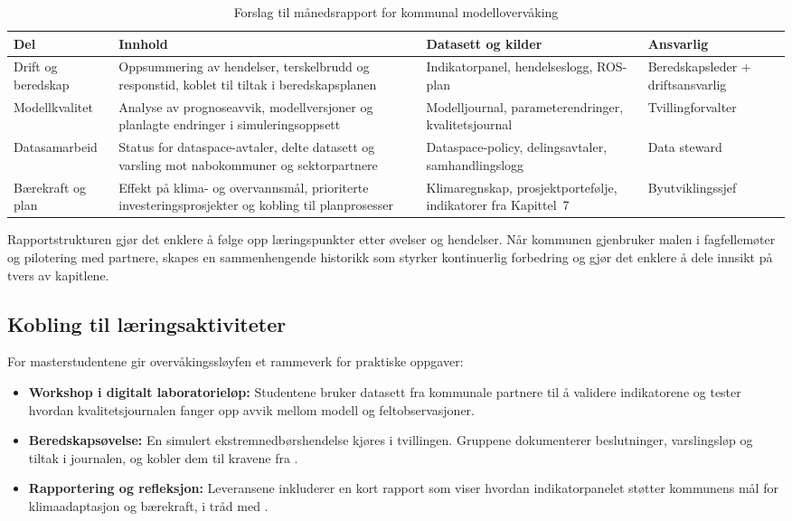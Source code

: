 \begin{table}[ht]
    \centering
    \caption{Forslag til månedsrapport for kommunal modellovervåking}
    \label{tab:manedsrapport}
    \begin{tabular}{|p{3.1cm}|p{4.8cm}|p{4.6cm}|p{3.0cm}|}
        \hline
        \textbf{Del} & \textbf{Innhold} & \textbf{Datasett og kilder} & \textbf{Ansvarlig} \\
        \hline
        Drift og beredskap & Oppsummering av hendelser, terskelbrudd og responstid, koblet til tiltak i beredskapsplanen & Indikatorpanel, hendelseslogg, ROS-plan \citep{dsb2022beredskap} & Beredskapsleder + driftsansvarlig \\
        \hline
        Modellkvalitet & Analyse av prognoseavvik, modellversjoner og planlagte endringer i simuleringsoppsett & Modelljournal, parameterendringer, kvalitetsjournal & Tvillingforvalter \\
        \hline
        Datasamarbeid & Status for dataspace-avtaler, delte datasett og varsling mot nabokommuner og sektorpartnere & Dataspace-policy, delingsavtaler, samhandlingslogg \citep{ks2022samhandling} & Data steward \\
        \hline
        Bærekraft og plan & Effekt på klima- og overvannsmål, prioriterte investeringsprosjekter og kobling til planprosesser & Klimaregnskap, prosjektportefølje, indikatorer fra Kapittel~7 & Byutviklingssjef \\
        \hline
    \end{tabular}
\end{table}

Rapportstrukturen gjør det enklere å følge opp læringspunkter etter øvelser og hendelser. Når kommunen gjenbruker malen i fagfellemøter og pilotering med partnere, skapes en sammenhengende historikk som styrker kontinuerlig forbedring og gjør det enklere å dele innsikt på tvers av kapitlene.

\subsection{Kobling til læringsaktiviteter}
For masterstudentene gir overvåkingssløyfen et rammeverk for praktiske oppgaver:
\begin{itemize}
    \item \textbf{Workshop i digitalt laboratorieløp:} Studentene bruker datasett fra kommunale partnere til å validere indikatorene og tester hvordan kvalitetsjournalen fanger opp avvik mellom modell og feltobservasjoner.
    \item \textbf{Beredskapsøvelse:} En simulert ekstremnedbørshendelse kjøres i tvillingen. Gruppene dokumenterer beslutninger, varslingsløp og tiltak i journalen, og kobler dem til kravene fra \citet{dsb2022beredskap}.
    \item \textbf{Rapportering og refleksjon:} Leveransene inkluderer en kort rapport som viser hvordan indikatorpanelet støtter kommunens mål for klimaadaptasjon og bærekraft, i tråd med \citet{oslo2023overvann}.
\end{itemize}

